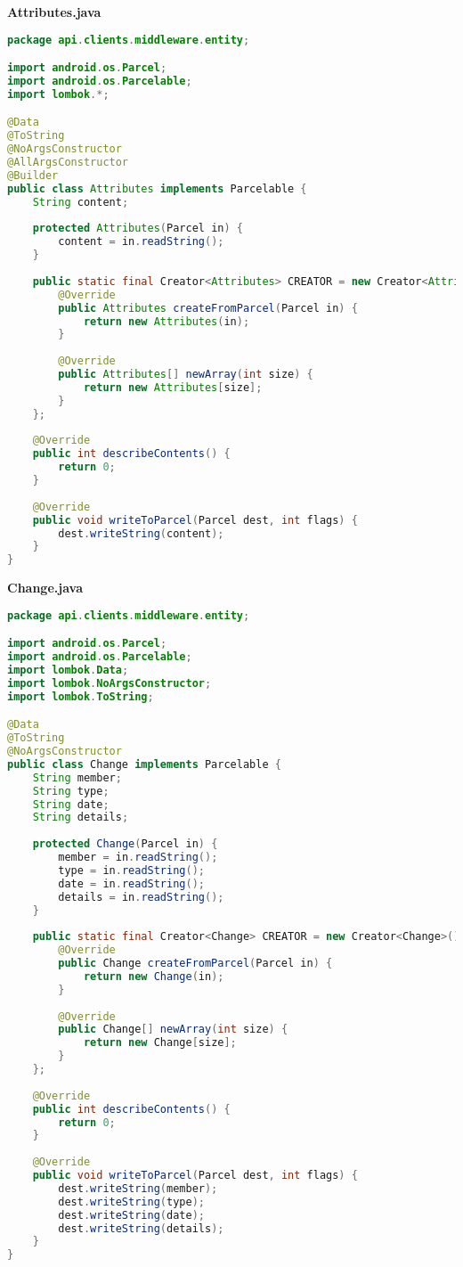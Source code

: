 \textbf{Attributes.java}
\begin{lstlisting}[language=Java]
package api.clients.middleware.entity;

import android.os.Parcel;
import android.os.Parcelable;
import lombok.*;

@Data
@ToString
@NoArgsConstructor
@AllArgsConstructor
@Builder
public class Attributes implements Parcelable {
	String content;
	
	protected Attributes(Parcel in) {
		content = in.readString();
	}
	
	public static final Creator<Attributes> CREATOR = new Creator<Attributes>() {
		@Override
		public Attributes createFromParcel(Parcel in) {
			return new Attributes(in);
		}
		
		@Override
		public Attributes[] newArray(int size) {
			return new Attributes[size];
		}
	};
	
	@Override
	public int describeContents() {
		return 0;
	}
	
	@Override
	public void writeToParcel(Parcel dest, int flags) {
		dest.writeString(content);
	}
}

\end{lstlisting}
\textbf{Change.java}
\begin{lstlisting}[language=Java]
package api.clients.middleware.entity;

import android.os.Parcel;
import android.os.Parcelable;
import lombok.Data;
import lombok.NoArgsConstructor;
import lombok.ToString;

@Data
@ToString
@NoArgsConstructor
public class Change implements Parcelable {
	String member;
	String type;
	String date;
	String details;
	
	protected Change(Parcel in) {
		member = in.readString();
		type = in.readString();
		date = in.readString();
		details = in.readString();
	}
	
	public static final Creator<Change> CREATOR = new Creator<Change>() {
		@Override
		public Change createFromParcel(Parcel in) {
			return new Change(in);
		}
		
		@Override
		public Change[] newArray(int size) {
			return new Change[size];
		}
	};
	
	@Override
	public int describeContents() {
		return 0;
	}
	
	@Override
	public void writeToParcel(Parcel dest, int flags) {
		dest.writeString(member);
		dest.writeString(type);
		dest.writeString(date);
		dest.writeString(details);
	}
}

\end{lstlisting}
